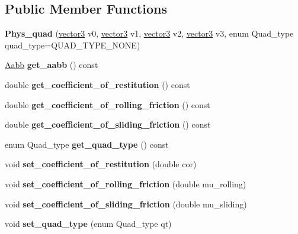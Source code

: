 \subsection*{Public Member Functions}
\begin{DoxyCompactItemize}
\item 
\hypertarget{class_phys__quad_a5ab47289d506e64a458550c07044207f}{
{\bfseries Phys\_\-quad} (\hyperlink{classvector3d}{vector3} v0, \hyperlink{classvector3d}{vector3} v1, \hyperlink{classvector3d}{vector3} v2, \hyperlink{classvector3d}{vector3} v3, enum Quad\_\-type quad\_\-type=QUAD\_\-TYPE\_\-NONE)}
\label{class_phys__quad_a5ab47289d506e64a458550c07044207f}

\item 
\hypertarget{class_phys__quad_a86a20e47f235166cf08f08a971729704}{
\hyperlink{class_aabb}{Aabb} {\bfseries get\_\-aabb} () const }
\label{class_phys__quad_a86a20e47f235166cf08f08a971729704}

\item 
\hypertarget{class_phys__quad_ae59b0fcfc095df760cd3e78836296931}{
double {\bfseries get\_\-coefficient\_\-of\_\-restitution} () const }
\label{class_phys__quad_ae59b0fcfc095df760cd3e78836296931}

\item 
\hypertarget{class_phys__quad_a681032913d7bea0da7d4a968e333eada}{
double {\bfseries get\_\-coefficient\_\-of\_\-rolling\_\-friction} () const }
\label{class_phys__quad_a681032913d7bea0da7d4a968e333eada}

\item 
\hypertarget{class_phys__quad_a092b0732e7cd0e3fa8a3d449430aba68}{
double {\bfseries get\_\-coefficient\_\-of\_\-sliding\_\-friction} () const }
\label{class_phys__quad_a092b0732e7cd0e3fa8a3d449430aba68}

\item 
\hypertarget{class_phys__quad_a4c5b13d6dd51f1ae5dfb3a36eb514e0b}{
enum Quad\_\-type {\bfseries get\_\-quad\_\-type} () const }
\label{class_phys__quad_a4c5b13d6dd51f1ae5dfb3a36eb514e0b}

\item 
\hypertarget{class_phys__quad_afa2cb67e5935da8a6df793da202446eb}{
void {\bfseries set\_\-coefficient\_\-of\_\-restitution} (double cor)}
\label{class_phys__quad_afa2cb67e5935da8a6df793da202446eb}

\item 
\hypertarget{class_phys__quad_a3cffc1bc377b4edd3b82bdb462d83651}{
void {\bfseries set\_\-coefficient\_\-of\_\-rolling\_\-friction} (double mu\_\-rolling)}
\label{class_phys__quad_a3cffc1bc377b4edd3b82bdb462d83651}

\item 
\hypertarget{class_phys__quad_a4bb6cc881934be893ab1276111cd44e3}{
void {\bfseries set\_\-coefficient\_\-of\_\-sliding\_\-friction} (double mu\_\-sliding)}
\label{class_phys__quad_a4bb6cc881934be893ab1276111cd44e3}

\item 
\hypertarget{class_phys__quad_a6b5de24945ef2e641984bd8b18e1bda6}{
void {\bfseries set\_\-quad\_\-type} (enum Quad\_\-type qt)}
\label{class_phys__quad_a6b5de24945ef2e641984bd8b18e1bda6}

\end{DoxyCompactItemize}


